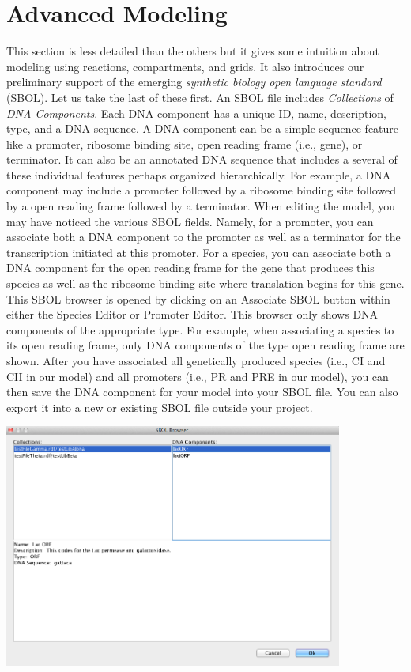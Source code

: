 \documentclass[titlepage,11pt]{article}
\begin{document}
\section{Advanced Modeling}

This section is less detailed than the others but it gives some intuition about modeling using reactions, compartments, and grids.  It also introduces our preliminary support of the emerging \emph{synthetic biology open language standard} (SBOL).  Let us take the last of these first.  An SBOL file includes \emph{Collections} of \emph{DNA Components}.  Each DNA component has a unique ID, name, description, type, and a DNA sequence.  A DNA component can be a simple sequence feature like a promoter, ribosome binding site, open reading frame (i.e., gene), or terminator.  It can also be an annotated DNA sequence that includes a several of these individual features perhaps organized hierarchically.  For example, a DNA component may include a promoter followed by a ribosome binding site followed by a open reading frame followed by a terminator.  When editing the model, you may have noticed the various SBOL fields.  Namely, for a promoter, you can associate both a DNA component to the promoter as well as a terminator for the transcription initiated at this promoter.  For a species, you can associate both a DNA component for the open reading frame for the gene that produces this species as well as the ribosome binding site where translation begins for this gene.  This SBOL browser is opened by clicking on an Associate SBOL button within either the Species Editor or Promoter Editor.  This browser only shows DNA components of the appropriate type.  For example, when associating a species to its open reading frame, only DNA components of the type open reading frame are shown.  After you have associated all genetically produced species (i.e., CI and CII in our model) and all promoters (i.e., PR and PRE in our model), you can then save the DNA component for your model into your SBOL file.  You can also export it into a new or existing SBOL file outside your project.

\begin{center}
\includegraphics[height=80mm]{screenshots/AssociateSBOL}
\end{center}
\end{document}
